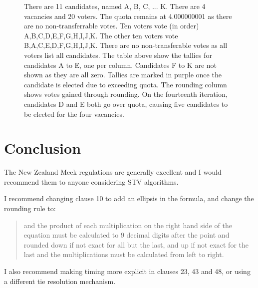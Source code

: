 \documentclass{article}
\begin{document}
\begin{figure}
{    There are 11 candidates, named A, B, C, ... K. There are 4 vacancies and 20 voters.
    The quota remains at 4.000000001 as there are no non-transferrable votes.
    Ten voters vote (in order) A,B,C,D,E,F,G,H,I,J,K. The other ten voters vote B,A,C,E,D,F,G,H,I,J,K.
    There are no non-transferable votes as all voters list all candidates.
    The table above show the tallies for candidates A to E, one per column. Candidates F to K are not
    shown as they are all zero. Tallies are marked in purple once the candidate is elected due to exceeding quota. The rounding column shows votes gained through rounding. 
    On the fourteenth iteration, candidates D and E both go over quota, causing
    five candidates to be elected for the four vacancies. 
    }
    \label{fig:too_many_elected}
\end{figure}

\section{Conclusion}

The New Zealand Meek regulations are generally excellent and I would recommend them to anyone considering STV algorithms. 

I recommend changing clause 10 to add an ellipsis in the 
formula, and change the rounding rule to:
\begin{quote}
and the product of each multiplication on the right hand side of the equation must be calculated to 9 decimal digits after the point and rounded down if not exact for all but the last, and up if not exact for the last and the multiplications must be calculated from left to right.
\end{quote}

I also recommend making timing more explicit in clauses 23, 43 and 48, or using a different tie resolution mechanism.


\end{document}
